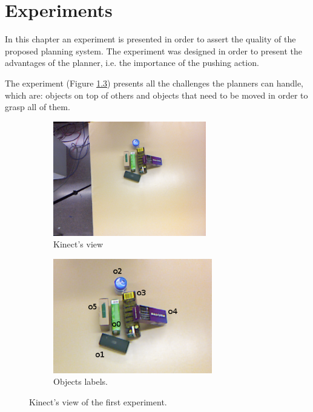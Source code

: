 \chapter{Experiments}
\label{ch:experiments}

In this chapter an experiment is presented in order to assert the quality of the proposed planning system. The experiment was designed in order to present the advantages of the planner, i.e. the importance of the pushing action. 

The experiment (Figure \ref{fig:experiment_good}) presents all the challenges the planners can handle, which are: objects on top of others and objects that need to be moved in order to grasp all of them. 
\begin{figure}[tb]
\centering
\begin{subfigure}[t]{0.45\textwidth}
\centering
\includegraphics[height=5cm]{Img/experiments/image.png}
\caption{Kinect's view}\label{fig:experiment_good1}
\end{subfigure}
\begin{subfigure}[t]{0.45\textwidth}
\centering
\includegraphics[height=5cm]{Img/experiments/image_labels.png}
\caption{Objects labels.}\label{fig:experiment_good2}
\end{subfigure}
\caption{Kinect's view of the first experiment.}\label{fig:experiment_good}
\end{figure}


